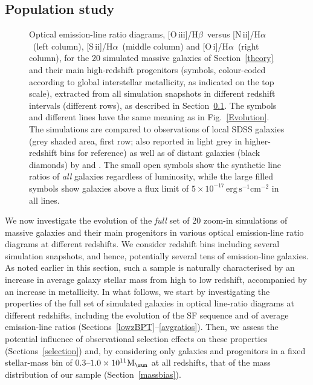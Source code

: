 \documentclass[fleqn,usenatbib]{mnras}
\newcommand{\Msun}{\hbox{M$_\sun$}}
\newcommand{\oiiihb}{\hbox{[O\,{\sc iii}]/H$\beta$}}
\newcommand{\niiha}{\hbox{[N\,{\sc ii}]/H$\alpha$}}
\newcommand{\siiha}{\hbox{[S\,{\sc ii}]/H$\alpha$}}
\newcommand{\oiha}{\hbox{[O\,{\sc i}]/H$\alpha$}}
\begin{document}
\subsection{Population study}\label{popstudy}

\begin{figure*}
\centering\vspace{-0.5cm}
 \caption{Optical emission-line ratio diagrams, \oiiihb\ versus \niiha\
   (left column), \siiha\ (middle column) and \oiha\ (right column), for the 20
   simulated massive galaxies of Section~\ref{theory} and their main high-redshift
   progenitors (symbols, colour-coded according to global interstellar metallicity, 
    as indicated on the top scale), 
   extracted from all simulation snapshots in different redshift intervals
   (different rows), as described in Section~\ref{popstudy}. The symbols and
   different lines have the same meaning as in Fig.~\ref{Evolution}. 
   The simulations are compared to observations of
   local SDSS galaxies (grey shaded area, first row; also reported in light grey in
   higher-redshift bins for reference) as well as of distant galaxies
  (black diamonds) by \citet[$z\sim1.4$]{Yabe12}  and
  \citet[$z\sim2.3$]{Steidel14}.  The small open symbols show the synthetic line ratios
   of {\it all} galaxies regardless of luminosity, while the large filled symbols show
   galaxies above a  flux limit of $\mathrm{5\times 10^{-17}\,erg\,s^{-1}cm^{-2}}$ in all lines. }\label{BPT}    
\end{figure*}
We now investigate the evolution of the {\it full} set of 20 zoom-in
simulations of massive galaxies and their main progenitors in various
optical emission-line ratio diagrams at different redshifts. We
consider redshift bins including several simulation snapshots, and
hence, potentially several tens of emission-line galaxies. As noted
earlier in this section, such a sample is naturally characterised by
an increase in average galaxy stellar mass from high to low redshift,
accompanied by an increase in metallicity. In what follows, we start
by investigating the properties of the full set of simulated galaxies
in optical line-ratio diagrams at different  redshifts, including the
evolution of the SF sequence and of average emission-line ratios
(Sections~\ref{lowzBPT}--\ref{avgratios}). Then, we  assess the
potential influence of observational selection effects on these
properties (Sections~\ref{selection}) and, by considering only
galaxies and progenitors in a fixed  stellar-mass bin of 0.3--$1.0
\times 10^{11}\Msun$ at all redshifts, that of the mass  distribution
of our sample (Section~\ref{massbias}). 
\end{document}
